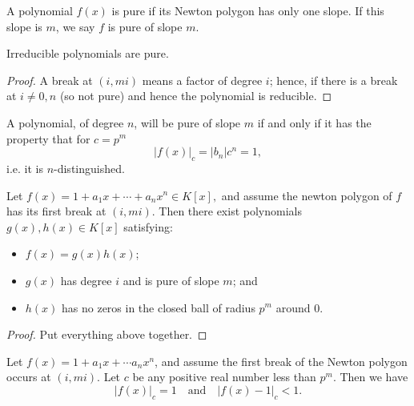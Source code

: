 
\begin{definition}
  A polynomial $f(x)$ is pure if its Newton polygon has only one slope. If this slope is $m$, we say
  $f$ is pure of slope $m$.
\end{definition}

\begin{proposition}
  Irreducible polynomials are pure.
\end{proposition}

\begin{proof}
  A break at $(i,mi)$ means a factor of degree $i$; hence, if there is a break at $i \neq 0, n$
  (so not pure) and hence the polynomial is reducible.
\end{proof}

\begin{proposition}
  A polynomial, of degree $n$, will be pure of slope $m$ if and only if it has the property that for
  $c = p^m$
  \[
  \lvert f(x) \rvert_c = \lvert b_n \rvert c^n = 1,
  \]
  i.e. it is $n$-distinguished.
\end{proposition}

\begin{theorem}
  Let $f(x) = 1 + a_1 x + \cdots + a_n x^n \in K[x],$ and assume the newton polygon of $f$ has its
  first break at $(i,mi)$. Then there exist polynomials $g(x), h(x) \in K[x]$ satisfying:
  \begin{itemize}
    \item $f(x) = g(x) h(x)$;
    \item $g(x)$ has degree $i$ and is pure of slope $m$; and
    \item $h(x)$ has no zeros in the closed ball of radius $p^m$ around 0.
  \end{itemize}
\end{theorem}

\begin{proof}
  Put everything above together.
\end{proof}

\begin{lemma}
  Let $f(x) = 1 + a_1 x + \cdots a_n x^n$, and assume the first break of the Newton polygon occurs
  at $(i,mi)$. Let $c$ be any positive real number less than $p^m$. Then we have
  \[
    \lvert f(x) \rvert_c = 1 \quad \text{and} \quad \lvert f(x) - 1 \rvert_c < 1.
  \]
\end{lemma}

